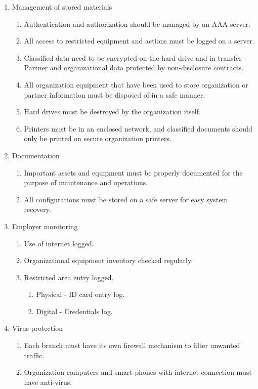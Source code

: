 \begin{enumerate}
  \item Management of stored materials
  \begin{enumerate}
    \item Authentication and authorization should be managed by an AAA server.
    \item All access to restricted equipment and actions must be logged on a server.
    \item Classified data need to be encrypted on the hard drive and in transfer - Partner and organizational data protected by non-disclosure contracts.
    \item All organization equipment that have been used to store organization or partner information must be disposed of in a safe manner.
    \item Hard drives must be destroyed by the organization itself.
    \item Printers must be in an enclosed network, and classified documents should only be printed on secure organization printers.
  \end{enumerate}
  \item Documentation
  \begin{enumerate}
      \item Important assets and equipment must be properly documented for the purpose of maintenance and operations.
      \item All configurations must be stored on a safe server for easy system recovery.
  \end{enumerate}
  \item Employer monitoring
  \begin{enumerate}
    \item Use of internet logged.
    \item Organizational equipment inventory checked regularly.
    \item Restricted area entry logged.
    \begin{enumerate}
      \item Physical - ID card entry log.
      \item Digital - Credentials log.
    \end{enumerate}
  \end{enumerate}
  \item Virus protection
  \begin{enumerate}
    \item Each branch must have its own firewall mechanism to filter unwanted traffic.
    \item Organization computers and smart-phones with internet connection must have anti-virus.

\end{enumerate}
\end{enumerate}
